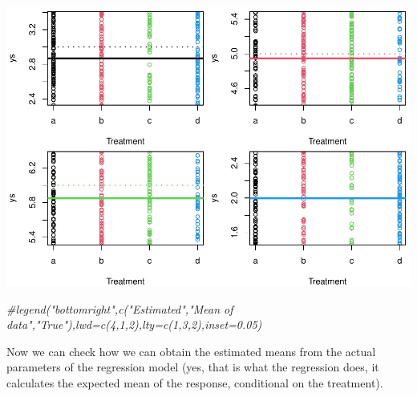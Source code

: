 \documentclass[
]{book}
\newenvironment{Shaded}{\begin{snugshade}}{\end{snugshade}}
\newcommand{\AttributeTok}[1]{\textcolor[rgb]{0.77,0.63,0.00}{#1}}
\newcommand{\CommentTok}[1]{\textcolor[rgb]{0.56,0.35,0.01}{\textit{#1}}}
\newcommand{\DecValTok}[1]{\textcolor[rgb]{0.00,0.00,0.81}{#1}}
\newcommand{\FunctionTok}[1]{\textcolor[rgb]{0.00,0.00,0.00}{#1}}
\newcommand{\NormalTok}[1]{#1}
\newcommand{\SpecialCharTok}[1]{\textcolor[rgb]{0.00,0.00,0.00}{#1}}
\newcommand{\StringTok}[1]{\textcolor[rgb]{0.31,0.60,0.02}{#1}}
\begin{document}
\begin{Shaded}
\end{Shaded}

\includegraphics{ECOMODbook_files/figure-latex/a8.33-1.pdf}

\begin{Shaded}
\begin{Highlighting}[]
\CommentTok{\#legend("bottomright",c("Estimated","Mean of data","True"),lwd=c(4,1,2),lty=c(1,3,2),inset=0.05)}
\end{Highlighting}
\end{Shaded}

Now we can check how we can obtain the estimated means from the actual parameters of the regression model (yes, that is what the regression does, it calculates the expected mean of the response, conditional on the treatment).
\end{document}
